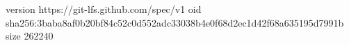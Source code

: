 version https://git-lfs.github.com/spec/v1
oid sha256:3baba8af0b20bf84c52c0d552adc33038b4e0f68d2ec1d42f68a635195d7991b
size 262240

